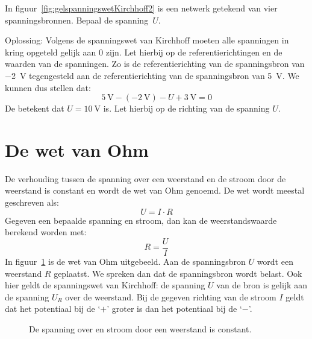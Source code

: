 \begin{example}
In figuur~\ref{fig:gelspanningswetKirchhoff2} is een netwerk getekend van vier spanningsbronnen.
Bepaal de spanning~$U$.
\begin{center}
\centering
{}
\label{fig:gelspanningswetKirchhoff2}
\end{center}
Oplossing: Volgens de spanningswet van Kirchhoff moeten alle spanningen in kring opgeteld gelijk aan 0 zijn.
Let hierbij op de referentierichtingen en de waarden van de spanningen. Zo is de referentierichting van
de spanningsbron van \SI{-2}{\volt} tegengesteld aan de referentierichting van de spanningsbron van
\SI{5}{\volt}. We kunnen dus stellen dat:
\begin{equation}
\SI{5}{\volt} - (\SI{-2}{\volt}) - U + \SI{3}{\volt} = 0
\end{equation}
De betekent dat $U = \SI{10}{\volt}$ is. Let hierbij op de richting van de spanning $U$.
\end{example}


\section{De wet van Ohm}
De verhouding tussen de spanning over een weerstand en de stroom door de weerstand is constant
en wordt de wet van Ohm genoemd. De wet wordt meestal geschreven als:
\begin{equation}
U=I\cdot R
\end{equation}
%
Gegeven een bepaalde spanning en stroom, dan kan de weerstandswaarde berekend worden met:
%
\begin{equation}
R = \dfrac{U}{I}
\end{equation}
%
In figuur~\ref{fig:geldewetvanohm} is de wet van Ohm uitgebeeld. Aan de spanningsbron $U$ wordt
een weerstand $R$ geplaatst. We spreken dan dat de spanningsbron wordt belast. Ook hier geldt de
spanningswet van Kirchhoff: de spanning $U$ van de bron is gelijk aan de spanning $U_R$ over de
weerstand. Bij de gegeven richting van de stroom $I$ geldt dat het potentiaal bij de `$+$' groter
is dan het potentiaal bij de `$-$'.

\begin{figure}[!ht]
\centering
{}
\caption{De spanning over en stroom door een weerstand is constant.}
\label{fig:geldewetvanohm}
\end{figure}

